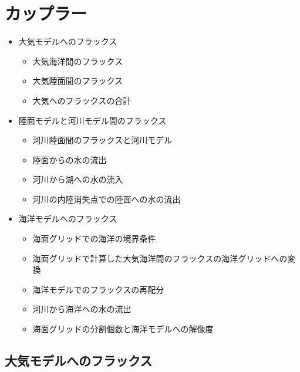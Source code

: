 \hypertarget{ux30abux30c3ux30d7ux30e9ux30fc}{%
\section{カップラー}\label{ux30abux30c3ux30d7ux30e9ux30fc}}

\begin{itemize}
\tightlist
\item
  大気モデルへのフラックス

  \begin{itemize}
  \tightlist
  \item
    大気海洋間のフラックス
  \item
    大気陸面間のフラックス
  \item
    大気へのフラックスの合計
  \end{itemize}
\item
  陸面モデルと河川モデル間のフラックス

  \begin{itemize}
  \tightlist
  \item
    河川陸面間のフラックスと河川モデル
  \item
    陸面からの水の流出
  \item
    河川から湖への水の流入
  \item
    河川の内陸消失点での陸面への水の流出
  \end{itemize}
\item
  海洋モデルへのフラックス

  \begin{itemize}
  \tightlist
  \item
    海面グリッドでの海洋の境界条件
  \item
    海面グリッドで計算した大気海洋間のフラックスの海洋グリッドへの変換
  \item
    海洋モデルでのフラックスの再配分
  \item
    河川から海洋への水の流出
  \item
    海面グリッドの分割個数と海洋モデルへの解像度
  \end{itemize}
\end{itemize}

\hypertarget{ux5927ux6c17ux30e2ux30c7ux30ebux3078ux306eux30d5ux30e9ux30c3ux30afux30b9}{%
\subsection{大気モデルへのフラックス}\label{ux5927ux6c17ux30e2ux30c7ux30ebux3078ux306eux30d5ux30e9ux30c3ux30afux30b9}}

